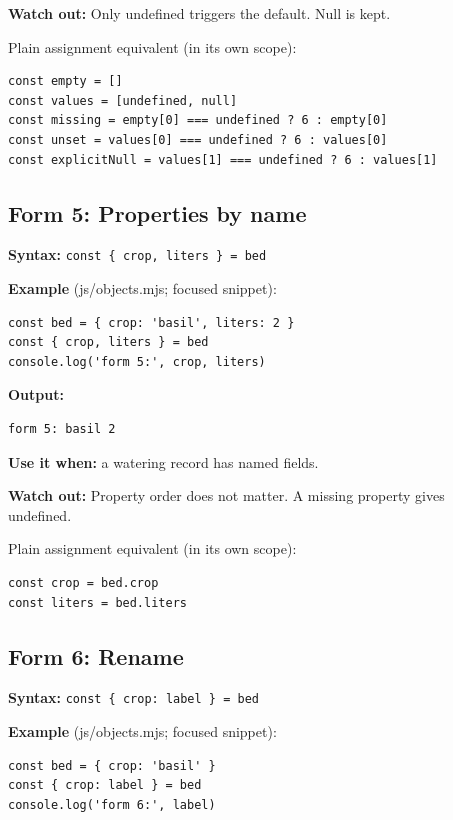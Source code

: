 \documentclass[
  10pt,
  a4paper,
]{article}
\begin{document}
\textbf{Watch out:} Only undefined triggers the default. Null is kept.

Plain assignment equivalent (in its own scope):

\begin{lstlisting}
const empty = []
const values = [undefined, null]
const missing = empty[0] === undefined ? 6 : empty[0]
const unset = values[0] === undefined ? 6 : values[0]
const explicitNull = values[1] === undefined ? 6 : values[1]
\end{lstlisting}

\subsection{Form 5: Properties by name}\label{form-5-properties-by-name}

\textbf{Syntax:}
\texttt{const \{ crop,\allowbreak{} liters \} =\allowbreak{} bed}

\textbf{Example} (js/objects.mjs; focused snippet):

\begin{lstlisting}
const bed = { crop: 'basil', liters: 2 }
const { crop, liters } = bed
console.log('form 5:', crop, liters)
\end{lstlisting}

\textbf{Output:}

\begin{lstlisting}
form 5: basil 2
\end{lstlisting}

\textbf{Use it when:} a watering record has named fields.

\textbf{Watch out:} Property order does not matter. A missing property
gives undefined.

Plain assignment equivalent (in its own scope):

\begin{lstlisting}
const crop = bed.crop
const liters = bed.liters
\end{lstlisting}

\subsection{Form 6: Rename}\label{form-6-rename}

\textbf{Syntax:}
\texttt{const \{ crop:\allowbreak{} label \} =\allowbreak{} bed}

\textbf{Example} (js/objects.mjs; focused snippet):

\begin{lstlisting}
const bed = { crop: 'basil' }
const { crop: label } = bed
console.log('form 6:', label)
\end{lstlisting}
\end{document}
